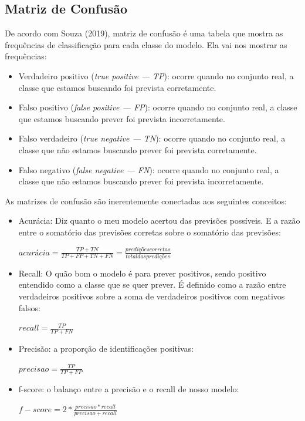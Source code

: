 \subsection{Matriz de Confusão}
De acordo com Souza (2019)\nocite{souza_2019}, matriz de confusão é uma tabela que mostra as frequências de classificação para cada classe do modelo. Ela vai nos mostrar as frequências:
\begin{itemize}
    \item Verdadeiro positivo (\textit{true positive — TP}): ocorre quando no conjunto real, a classe que estamos buscando foi prevista corretamente.
    \item Falso positivo (\textit{false positive — FP}): ocorre quando no conjunto real, a classe que estamos buscando prever foi prevista incorretamente. 
    \item Falso verdadeiro (\textit{true negative — TN}): ocorre quando no conjunto real, a classe que não estamos buscando prever foi prevista corretamente.
    \item Falso negativo (\textit{false negative — FN}): ocorre quando no conjunto real, a classe que não estamos buscando prever foi prevista incorretamente.

\end{itemize}

As matrizes de confusão são inerentemente conectadas aos seguintes conceitos:

\begin{itemize}
    \item Acurácia: Diz quanto o meu modelo acertou das previsões possíveis. E a razão entre o somatório das previsões corretas sobre o somatório das previsões:
    \begin{center}
        $acurácia = \frac{TP+TN}{TP+FP+TN+FN} = \frac{predições corretas}{total das predições}$
    \end{center}
    \item Recall: O quão bom o modelo é para prever positivos, sendo positivo entendido como a classe que se quer prever. É definido como a razão entre verdadeiros positivos sobre a soma de verdadeiros positivos com negativos falsos:
    \begin{center}
        $recall = \frac{TP}{TP+FN}$
    \end{center}
    \item Precisão: a proporção de identificações positivas:
    \begin{center}
        $precisao = \frac{TP}{TP+FP}$
    \end{center}
    \item f-score: o balanço entre a precisão e o recall de nosso modelo:
    \begin{center}
        $f-score = 2*\frac{precisao*recall}{precisao+recall}$
    \end{center}
\end{itemize}

